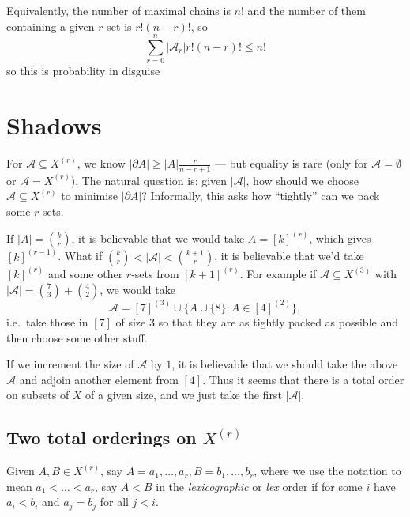 \documentclass[a4paper]{article}
\newcommand{\shadow}{\partial}
\begin{document}

\begin{remark}
  Equivalently, the number of maximal chains is \(n!\) and the number of them containing a given \(r\)-set is \(r! (n - r)!\), so
  \[
    \sum_{r = 0}^n |\mathcal A_r| r! (n - r)! \leq n!
  \]
  so this is probability in disguise
\end{remark}

\section{Shadows}

For \(\mathcal A \subseteq X^{(r)}\), we know \(|\shadow A| \geq |A| \frac{r}{n - r + 1}\) --- but equality is rare (only for \(\mathcal A = \emptyset\) or \(\mathcal A = X^{(r)}\)). The natural question is: given \(|\mathcal A|\), how should we choose \(\mathcal A \subseteq X^{(r)}\) to minimise \(|\shadow A|\)? Informally, this asks how ``tightly'' can we pack some \(r\)-sets.

If \(|A| = \binom{k}{r}\), it is believable that we would take \(A = [k]^{(r)}\), which gives \([k]^{(r - 1)}\). What if \(\binom{k}{r} < |\mathcal A| <\binom{k + 1}{r}\), it is believable that we'd take \([k]^{(r)}\) and some other \(r\)-sets from \([k + 1]^{(r)}\). For example if \(\mathcal A \subseteq X^{(3)}\) with \(|\mathcal A| = \binom{7}{3} + \binom{4}{2}\), we would take
\[
  \mathcal A = [7]^{(3)} \cup \{A \cup \{8\}: A \in [4]^{(2)}\},
\]
i.e.\ take those in \([7]\) of size \(3\) so that they are as tightly packed as possible and then choose some other stuff.

If we increment the size of \(\mathcal A\) by \(1\), it is believable that we should take the above \(\mathcal A\) and adjoin another element from \([4]\). Thus it seems that there is a total order on subsets of \(X\) of a given size, and we just take the first \(|\mathcal A|\).

\subsection{Two total orderings on \(X^{(r)}\)}

\begin{definition}
  Given \(A, B \in X^{(r)}\), say \(A = a_1, \dots, a_r, B = b_1, \dots, b_r\), where we use the notation to mean \(a_1 < \dots < a_r\), say \(A < B\) in the \emph{lexicographic} or \emph{lex} order if for some \(i\) have \(a_i < b_i\) and \(a_j = b_j\) for all \(j < i\).
\end{definition}
\end{document}
